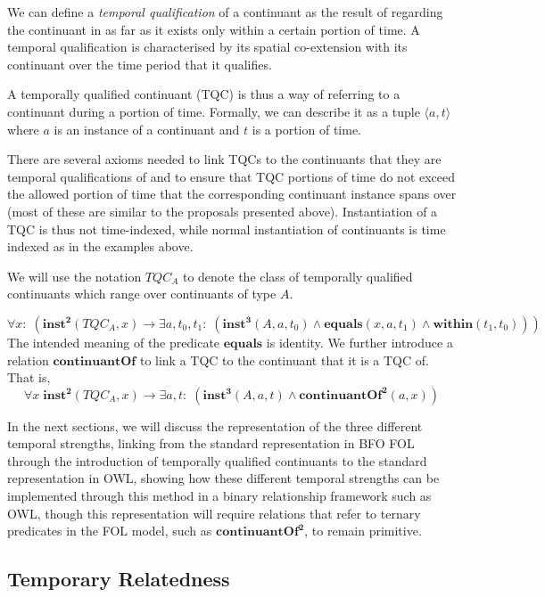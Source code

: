 \documentclass[10pt]{bmc_article}
\newcommand{\mirel}[1]{\ensuremath{\mathrm{\mathbf{#1}}}}
\newcommand{\mclass}[1]{\ensuremath{\mathit{#1}}}
\newcommand{\mrel}[2]{\mirel{#1^#2}}
\newcommand{\mrelb}[1]{\mrel{#1}{2}}
\newcommand{\mrelt}[1]{\mrel{#1}{3}}
\newcommand{\pair}[2]{\ensuremath{\langle #1,#2\rangle}}
\newcommand{\TQC}[1]{\ensuremath{TQC_{\mclass{#1}}}}
\newenvironment{bmcformat}{\baselineskip20pt\sloppy\setboolean{publ}{false}}{\baselineskip20pt\sloppy}
\begin{document}
\begin{bmcformat}
We can define a \emph{temporal qualification} of a
continuant as the result of regarding the continuant in as far as it exists only
within a certain portion of time. A temporal qualification is 
characterised by its spatial co-extension with its continuant over the time
period that it qualifies.

A temporally qualified continuant (TQC) is thus a way of referring to a continuant
during a portion of time. Formally, we can describe it as a tuple \pair{a}{t}
where $a$ is an instance
of a continuant and $t$ is a portion of time. 

There are several axioms needed to link TQCs to the continuants that they are
temporal qualifications of and to ensure that TQC portions of time do not exceed the
allowed portion of time that the corresponding continuant instance spans over
(most of these are similar to the proposals presented above).
Instantiation of a TQC is thus not time-indexed, while normal instantiation of
continuants is time indexed as in the examples above. 


We will use the notation \TQC{A} to denote the class of temporally qualified
continuants which range over continuants of type \mclass{A}.

\begin{equation}
\forall x:\; (\mrelb{inst}(\TQC{A},x) \rightarrow \exists a,t_0,t_1:\;(
\mrelt{inst}(\mclass{A},a,t_0) \wedge \mirel{equals}(x,a,t_1) \wedge
\mirel{within}(t_1,t_0)))
\end{equation}
The intended meaning of the predicate \mirel{equals} is identity.  
We further introduce a relation \mirel{continuantOf} to link a TQC to the continuant
that it is a TQC of. That is, 
\begin{equation}
\forall x\; \mrelb{inst}(\TQC{A},x) \rightarrow \exists a,t:\;(
\mrelt{inst}(\mclass{A}, a,t) \wedge \mrelb{continuantOf}(a,x))
\end{equation}

In the next sections, we will discuss the representation of the three different
temporal strengths, linking from the standard representation in BFO FOL through
the introduction of temporally qualified continuants to the standard
representation in OWL, showing how these different temporal strengths can be
implemented through this method in a binary relationship framework such as OWL,
though this representation will require relations that refer to ternary
predicates in the FOL model, such as \mrelb{continuantOf}, to remain primitive.

\subsection*{Temporary Relatedness}


\end{bmcformat}
\end{document}
